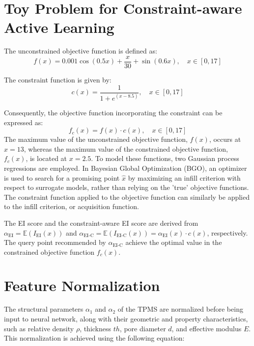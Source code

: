 \documentclass[preprint,review,12pt,authoryear]{elsarticle}
\begin{document}
\section{Toy Problem for Constraint-aware Active Learning}
The unconstrained objective function is defined as:
\begin{equation}
    f(x) = 0.001\cos(0.5x) + \frac{x}{30} + \sin(0.6x), \quad x \in [0, 17]
\end{equation}



The constraint function is given by:
\begin{equation}
c(x) = \frac{1}{1+e^{(x-8.5)}}, \quad x \in [0, 17]
\end{equation}

Consequently, the objective function incorporating the constraint can be expressed as:
\begin{equation}
f_c(x) = f(x) \cdot c(x), \quad x \in [0, 17]
\end{equation}
The maximum value of the unconstrained objective function, \( f(x) \), occurs at \( x = 13 \), whereas the maximum value of the constrained objective function, \( f_c(x) \), is located at \( x = 2.5 \). To model these functions, two Gaussian process regressions are employed. In Bayesian Global Optimization (BGO), an optimizer is used to search for a promising point \(\hat{x}\) by maximizing an infill criterion with respect to surrogate models, rather than relying on the 'true' objective functions. The constraint function applied to the objective function can similarly be applied to the infill criterion, or acquisition function.

The EI score and the constraint-aware EI score are derived from \(\alpha_{\text{EI}} = \mathbb{E}(I_{\text{EI}}(x))\) and \(\alpha_{\text{EI-C}} = \mathbb{E}(I_{\text{EI-C}}(x)) = \alpha_{\text{EI}}(x) \cdot c(x)\), respectively. The query point recommended by \(\alpha_{\text{EI-C}}\) achieve the optimal value in the constrained objective function \( f_c(x) \).

\section{Feature Normalization}

The structural parameters $\alpha_1$ and $\alpha_2$ of the TPMS are normalized before  being input to neural network, along with their geometric and property characteristics, such as relative density $\rho$, thickness $th$, pore diameter $d$, and effective modulus $E$. This normalization is achieved using the following equation:
\end{document}
